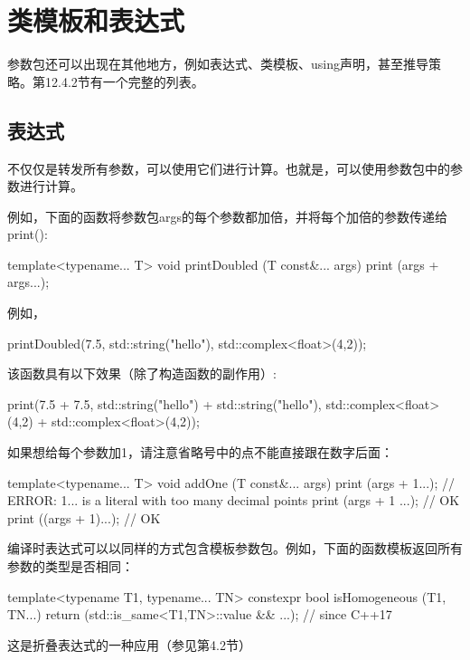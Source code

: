 \section{类模板和表达式}

参数包还可以出现在其他地方，例如表达式、类模板、using声明，甚至推导策略。第12.4.2节有一个完整的列表。

\subsection{表达式}

不仅仅是转发所有参数，可以使用它们进行计算。也就是，可以使用参数包中的参数进行计算。

例如，下面的函数将参数包args的每个参数都加倍，并将每个加倍的参数传递给print():

\begin{cpp}
template<typename... T>
void printDoubled (T const&... args) {
	print (args + args...);
}
\end{cpp}

例如，

\begin{cpp}
printDoubled(7.5, std::string("hello"), std::complex<float>(4,2));
\end{cpp}

该函数具有以下效果（除了构造函数的副作用）:

\begin{cpp}
print(7.5 + 7.5,
	std::string("hello") + std::string("hello"),
	std::complex<float>(4,2) + std::complex<float>(4,2));
\end{cpp}

如果想给每个参数加1，请注意省略号中的点不能直接跟在数字后面：

\begin{cpp}
template<typename... T>
void addOne (T const&... args) {
	print (args + 1...); // ERROR: 1... is a literal with too many decimal points
	print (args + 1 ...); // OK
	print ((args + 1)...); // OK
}
\end{cpp}

编译时表达式可以以同样的方式包含模板参数包。例如，下面的函数模板返回所有参数的类型是否相同：

\begin{cpp}
template<typename T1, typename... TN>
constexpr bool isHomogeneous (T1, TN...) {
	return (std::is_same<T1,TN>::value && ...); // since C++17
}
\end{cpp}

这是折叠表达式的一种应用（参见第4.2节）

